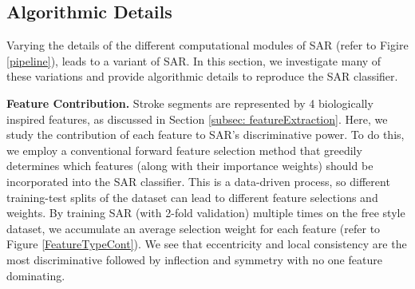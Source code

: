 \vspace{-2mm}
\subsection{Algorithmic Details} \label{subsec:variations}
\vspace{-2mm}
Varying the details of the different computational modules of SAR (refer to Figire \ref{pipeline}), leads to a variant of SAR. In this section, we investigate many of these variations and provide algorithmic details to reproduce the SAR classifier.


\noindent\textbf{Feature Contribution.} Stroke segments are represented by 4 biologically inspired features, as discussed in Section \ref{subsec: featureExtraction}. Here, we study the contribution of each feature to SAR's discriminative power. To do this, we employ a conventional forward feature selection method that greedily determines which features (along with their importance weights) should be incorporated into the SAR classifier. This is a data-driven process, so different training-test splits of the dataset can lead to different feature selections and weights. By training SAR (with 2-fold validation) multiple times on the free style dataset, we accumulate an average selection weight for each feature (refer to Figure \ref{FeatureTypeCont}). We see that eccentricity and local consistency are the most discriminative followed by inflection and symmetry with no one feature dominating.


